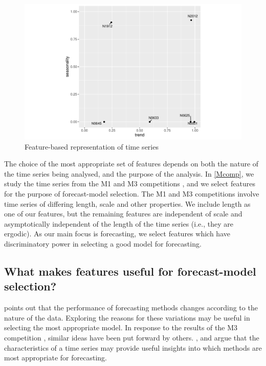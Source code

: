 \documentclass[11pt,a4paper,]{article}
\begin{document}
\begin{figure}

{\centering \includegraphics[width=0.7\linewidth]{figure/fig2-1} 

}

\caption{Feature-based representation of time series}\label{fig:fig2}
\end{figure}

The choice of the most appropriate set of features depends on both the nature of the time series being analysed, and the purpose of the analysis. In \autoref{Mcomp}, we study the time series from the M1 and M3 competitions \autocites{makridakis1982accuracy}{makridakis2000m3}, and we select features for the purpose of forecast-model selection. The M1 and M3 competitions involve time series of differing length, scale and other properties. We include length as one of our features, but the remaining features are independent of scale and asymptotically independent of the length of the time series (i.e., they are ergodic). As our main focus is forecasting, we select features which have discriminatory power in selecting a good model for forecasting.

\hypertarget{what-makes-features-useful-for-forecast-model-selection}{%
\subsection{What makes features useful for forecast-model selection?}\label{what-makes-features-useful-for-forecast-model-selection}}

\textcite{reid1972comparison} points out that the performance of forecasting methods changes according to the nature of the data. Exploring the reasons for these variations may be useful in selecting the most appropriate model. In response to the results of the M3 competition \autocite{makridakis2000m3}, similar ideas have been put forward by others. \textcite{hyndman2001s}, \textcite{lawrence2001s} and \textcite{armstrong2001s} argue that the characteristics of a time series may provide useful insights into which methods are most appropriate for forecasting.
\end{document}
